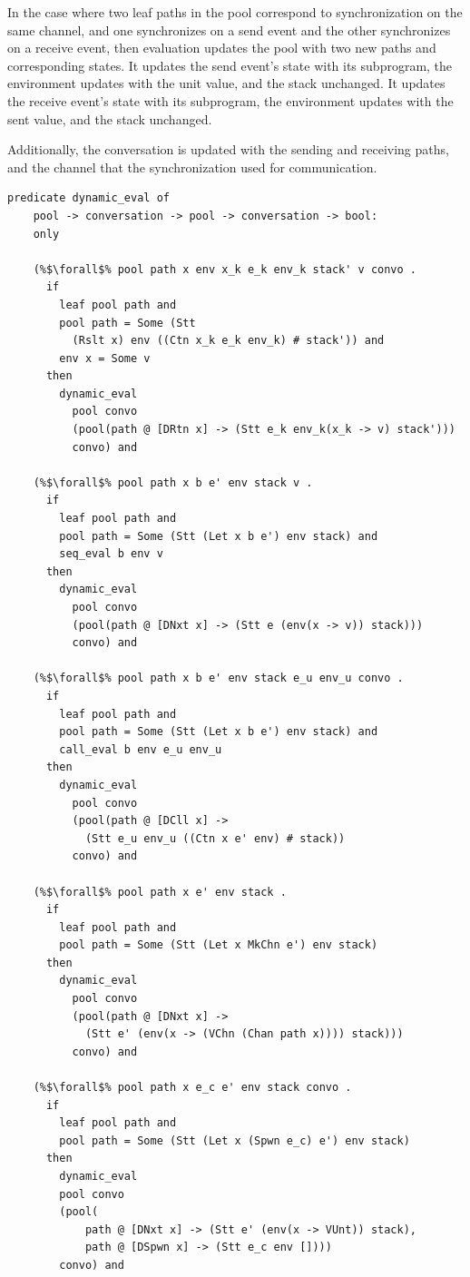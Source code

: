 \documentclass{article}
\begin{document}
In the case where two leaf paths in the pool correspond to synchronization on the same channel,
and one synchronizes on a send event and the other synchronizes on a receive event, then
evaluation updates the pool with two new paths and corresponding states.
It updates the send event's state with its subprogram, the environment updates with the unit
value, and the stack unchanged.  It updates the receive event's state with its subprogram, the
environment updates with the sent value, and the stack unchanged.

Additionally, the conversation is updated with the sending and receiving paths, and the channel
that the synchronization used for communication. 


\begin{lstlisting}[language=logic, escapechar=\%]
  predicate dynamic_eval of
    pool -> conversation -> pool -> conversation -> bool: 
    only

    (%$\forall$% pool path x env x_k e_k env_k stack' v convo .
      if
        leaf pool path and
        pool path = Some (Stt
          (Rslt x) env ((Ctn x_k e_k env_k) # stack')) and
        env x = Some v
      then
        dynamic_eval
          pool convo
          (pool(path @ [DRtn x] -> (Stt e_k env_k(x_k -> v) stack')))
          convo) and

    (%$\forall$% pool path x b e' env stack v .
      if 
        leaf pool path and
        pool path = Some (Stt (Let x b e') env stack) and
        seq_eval b env v
      then
        dynamic_eval
          pool convo
          (pool(path @ [DNxt x] -> (Stt e (env(x -> v)) stack)))
          convo) and

    (%$\forall$% pool path x b e' env stack e_u env_u convo .
      if 
        leaf pool path and 
        pool path = Some (Stt (Let x b e') env stack) and
        call_eval b env e_u env_u
      then
        dynamic_eval
          pool convo
          (pool(path @ [DCll x] ->
            (Stt e_u env_u ((Ctn x e' env) # stack))
          convo) and

    (%$\forall$% pool path x e' env stack .
      if 
        leaf pool path and
        pool path = Some (Stt (Let x MkChn e') env stack)
      then
        dynamic_eval
          pool convo 
          (pool(path @ [DNxt x] ->
            (Stt e' (env(x -> (VChn (Chan path x)))) stack)))
          convo) and

    (%$\forall$% pool path x e_c e' env stack convo .
      if 
        leaf pool path and 
        pool path = Some (Stt (Let x (Spwn e_c) e') env stack)
      then
        dynamic_eval
        pool convo 
        (pool(
            path @ [DNxt x] -> (Stt e' (env(x -> VUnt)) stack),
            path @ [DSpwn x] -> (Stt e_c env [])))
        convo) and


\end{lstlisting}
\end{document}

